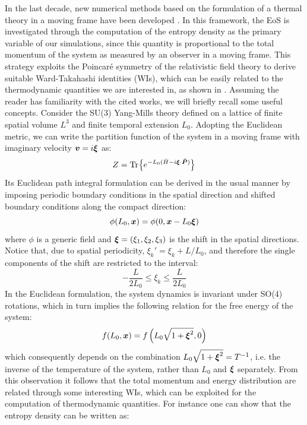 \documentclass{article}
\begin{document}
In the last decade, new numerical methods based on the formulation of a thermal theory in a moving frame have been developed \cite{Giusti_2014, Giusti_2017}. In this framework, the EoS is investigated through the computation of the entropy density as the primary variable of our simulations, since this quantity is proportional to the total momentum of the system as measured by an observer in a moving frame. This strategy exploits the Poincaré symmetry of the relativistic field theory to derive suitable Ward-Takahashi identities (WIs), which can be easily related to the thermodynamic quantities we are interested in, as shown in
 \cite{Implications, Giusti_2011}. Assuming the reader has familiarity with the cited works, we will briefly recall some useful concepts. Consider the SU(3) Yang-Mills theory defined on a lattice of finite spatial volume $L^3$ and finite temporal extension $L_0$. Adopting the Euclidean metric, we can write the partition function of the system in a moving frame with imaginary velocity $\vb*{v} = i\vb*{\xi}$ as:
\begin{equation}
    Z = \Tr{e^{-L_0(\hat{H} - i \vb*{\xi} \cdot \vb*{\hat{P}})}}
\end{equation}
Its Euclidean path integral formulation can be derived in the usual manner by imposing periodic boundary conditions in the spatial direction and shifted boundary conditions along the compact direction:
\begin{equation}
    \phi(L_0, \vb*{x}) = \phi(0, \vb*{x} - L_0 \vb*{\xi})
\end{equation}
where $\phi$ is a generic field and $\vb*{\xi} = (\xi_1, \xi_2, \xi_3)$ is the shift in the spatial directions. Notice that, due to spatial periodicity, $\xi_k' = \xi_k + L/L_0$, and therefore the single components of the shift are restricted to the interval:
\begin{equation}
    - \frac{L}{2L_0} \le \xi_k \le \frac{L}{2L_0}
\end{equation}
In the Euclidean formulation, the system dynamics is invariant under SO(4) rotations, which in turn implies the following relation for the free energy of the system:
\begin{equation}
    f(L_0, \vb*{x}) = f\left(L_0 \sqrt{1 + \vb*{\xi}^2}, 0\right)
\end{equation}
which consequently depends on the combination $L_0 \sqrt{1 + \vb*{\xi}^2} = T^{-1}$, i.e. the inverse of the temperature of the system, rather than $L_0$ and $\vb*{\xi}$ separately. %
From this observation it follows that the total momentum and energy distribution are related through some interesting WIs, which can be exploited for the computation of thermodynamic quantities. For instance one can show \cite{Giusti_2011, Giusti_2014, Giusti_2017, Implications} that the entropy density can be written as:
\end{document}
